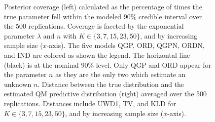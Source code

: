 \documentclass[preprint,12pt,authoryear]{elsarticle}
\begin{document}
\begin{figure}[hbt!]
\caption{Posterior coverage (left) calculated as the percentage of times the 
true parameter fell within the modeled 90\% credible interval over the 500 
replications. Coverage is faceted by the exponential parameter 
$\lambda$ and $n$ with $K \in \{3, 7, 15, 23, 50\}$, and by increasing sample 
size ($x$-axis). The five models QGP, ORD, QGPN, ORDN, and IND are colored as 
shown the legend. The horizontal line (black) is at the nominal 90\% level. 
Only QGP and ORD appear for the parameter $n$ as they are the only two which 
estimate an unknown $n$.
Distance between the true distribution and the estimated QM predictive 
distribution (right) averaged over the 500 replications. Distances include 
UWD1, TV, and KLD for $K \in \{3, 7, 15, 23, 50\}$, and by increasing sample 
size ($x$-axis).}
\label{fig:exp_cov_dists}
\end{figure}
\end{document}

